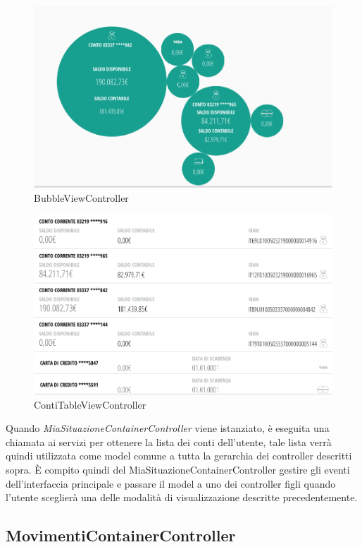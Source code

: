 \begin{figure}[!htbp]
\centering
\includegraphics[scale=0.35]{dettagli/bubble.png}
\caption{BubbleViewController}
\end{figure}
\begin{figure}[!htbp]
\centering
\includegraphics[scale=0.35]{dettagli/contiList.png}
\caption{ContiTableViewController}
\end{figure}
Quando \emph{MiaSituazioneContainerController} viene istanziato, è eseguita una chiamata ai servizi per ottenere la lista dei conti dell'utente, tale lista verrà quindi utilizzata come model comune a tutta la gerarchia dei controller descritti sopra. È compito quindi del MiaSituazioneContainerController gestire gli eventi dell'interfaccia principale e passare il model a uno dei controller figli quando l'utente sceglierà una delle modalità di visualizzazione descritte precedentemente. 

\subsection{MovimentiContainerController}

